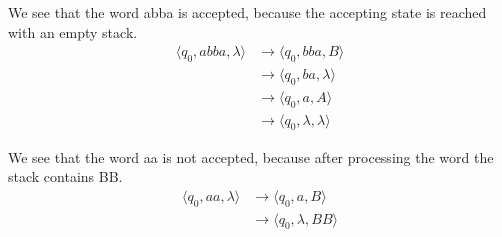 \documentclass{article}
\begin{document}
\begin{enumerate}[label= \alph*)]
  We see that the word abba is accepted, because the accepting state is reached with an empty stack.
  \begin{align*}
    \langle q_0, abba, \lambda \rangle &\rightarrow \langle q_0, bba, B \rangle \\
    &\rightarrow \langle q_0, ba, \lambda \rangle \\
    &\rightarrow \langle q_0, a, A \rangle \\
    &\rightarrow \langle q_0, \lambda, \lambda \rangle
  \end{align*}

  We see that the word aa is not accepted, because after processing the word the stack contains BB.
  \begin{align*}
    \langle q_0, aa, \lambda \rangle &\rightarrow \langle q_0, a, B \rangle \\
    &\rightarrow \langle q_0, \lambda, BB \rangle
  \end{align*}
\end{enumerate}
\end{document}

